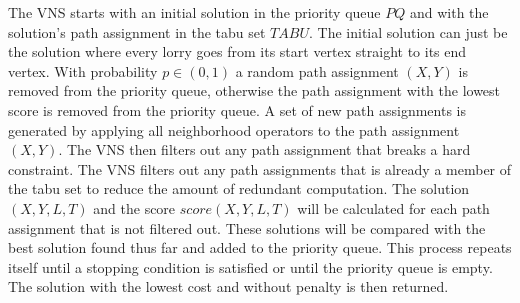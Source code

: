 The VNS starts with  an initial solution in the priority queue $PQ$ and with the solution's path assignment in the tabu set $TABU$.
%
The initial solution can just be the solution where every lorry goes from its start vertex straight to its end vertex.
%
%
With probability $p \in (0,1)$ a random path assignment $(X,Y)$ is removed from the priority queue, otherwise the path assignment with the lowest score is removed from the priority queue.
A set of new path assignments
is generated by applying all neighborhood operators to the path assignment $(X,Y)$.
The VNS then filters out any path assignment that breaks a hard constraint.
The VNS filters out any path assignments that is already a member of the tabu set to reduce the amount of redundant computation.
%
The solution $(X,Y,L,T)$ and the score $score(X,Y,L,T)$ will be calculated for each path assignment that is not filtered out.
These solutions will be compared with the best solution found thus far and added to the priority queue.
%
This process repeats itself until a stopping condition is satisfied or until the priority queue is empty.
The solution with the lowest cost and without penalty is then returned.



%


